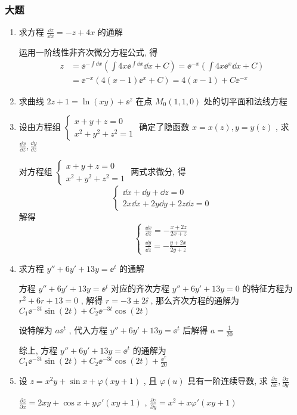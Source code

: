 \subsubsection{大题}
\begin{enumerate}
	\item 求方程 $\frac{\dd z}{\dd x}=-z+4x$ 的通解
	\begin{solution}
		运用一阶线性非齐次微分方程公式, 得
		\begin{align*}
			z&=\ee^{-\int\dd x}\left( \int 4x\ee^{\int \dd x}\dd x+C\right) =\ee^{-x}\left( \int 4x\ee^{x}\dd x+C\right) \\
			&=\ee^{-x}\left( 4(x-1)\ee^{x}+C\right) =4(x-1)+C\ee^{-x}
		\end{align*}
	\end{solution}
	\item 求曲线 $2z+1=\ln(xy)+\ee^z$ 在点 $M_{0}(1,1,0)$ 处的切平面和法线方程
	\item 设由方程组 $\begin{cases}
	x+y+z=0\\
	x^2+y^2+z^2=1
	\end{cases}$
	确定了隐函数 $x=x(z),y=y(z)$ , 求 $\frac{\dd x}{\dd z},\frac{\dd y}{\dd z}$
	\begin{solution}
		对方程组 $\begin{cases}
		x+y+z=0\\
		x^2+y^2+z^2=1
		\end{cases}$ 两式求微分, 得
		\begin{equation*}
			\begin{cases}
			\dd x+\dd y+\dd z=0\\
			2x\dd x+2y\dd y+2z\dd z=0
			\end{cases}
		\end{equation*}
		解得
		\begin{equation*}
			\begin{cases}
			\frac{\dd x}{\dd z}=-\frac{x+2z}{2x+z}\\
			\frac{\dd y}{\dd z}=-\frac{y+2x}{2y+z}
			\end{cases}
		\end{equation*}
	\end{solution}
	\item 求方程 $y''+6y'+13y=\ee^t$ 的通解
	\begin{solution}
		方程 $y''+6y'+13y=\ee^t$ 对应的齐次方程 $y''+6y'+13y=0$ 的特征方程为 $r^2+6r+13=0$ , 解得 $r=-3\pm2\ii$ , 那么齐次方程的通解为 $C_1\ee^{-3t}\sin(2t)+C_2\ee^{-3t}\cos(2t)$
		
		设特解为 $a\ee^{t}$ , 代入方程 $y''+6y'+13y=\ee^t$ 后解得 $a=\frac{1}{20}$
		
		综上, 方程 $y''+6y'+13y=\ee^t$ 的通解为 $C_1\ee^{-3t}\sin(2t)+C_2\ee^{-3t}\cos(2t)+\frac{\ee^x}{20}$
	\end{solution}
	\item 设 $z=x^2y+\sin x+\varphi(xy+1)$ , 且 $\varphi(u)$ 具有一阶连续导数, 求 $\frac{\partial z}{\partial x},\frac{\partial z}{\partial y}$
	\begin{solution}
		$\frac{\partial z}{\partial x}=2xy+\cos x+y\varphi'(xy+1)$ , $\frac{\partial z}{\partial y}=x^2+x\varphi'(xy+1)$
	\end{solution}
\end{enumerate}
